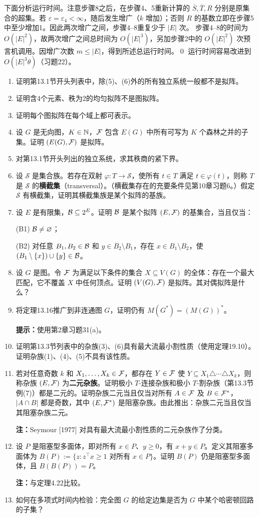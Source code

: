 下面分析运行时间。注意步骤8之后，在步骤4、5重新计算的 $\overline S,\overline T,R$ 分别是原集合的超集。若 $\varepsilon=\varepsilon_4<\infty$，随后发生增广（$k$ 增加）；否则 $R$ 的基数立即在步骤5中至少增加1。因此两次增广之间，步骤4--8重复少于 $|E|$ 次。
步骤4--8的时间为 $O(|E|^2)$，故两次增广之间总时间为 $O(|E|^3)$，另加步骤2中的 $O(|E|^2)$ 次预言机调用。因增广次数 $m\le|E|$，得到所述总运行时间。\qed
运行时间容易改进到 $O(|E|^3\theta)$（习题22）。
\begin{enumerate}[label=\arabic*.]
\item 证明第13.1节开头列表中，除(5)、(6)外的所有独立系统一般都不是拟阵。
\item 证明含4个元素、秩为2的均匀拟阵不是图拟阵。
\item 证明每个图拟阵在每个域上都可表示。
\item 设 $G$ 是无向图，$K\in\mathbb N$，$\mathcal F$ 包含 $E(G)$ 中所有可写为 $K$ 个森林之并的子集。证明 $(E(G),\mathcal F)$ 是拟阵。
\item 对第13.1节开头列出的独立系统，求其秩商的紧下界。
\item 设 $\mathcal S$ 是集合族。若存在双射 $\varphi:T\to\mathcal S$，使所有 $t\in T$ 满足 $t\in\varphi(t)$，则称 $T$ 是 $\mathcal S$ 的\textbf{横截集}（transversal）。（横截集存在的充要条件见第10章习题6。）假定 $\mathcal S$ 有横截集，证明其横截集族是某个拟阵的基族。
\item 设 $E$ 是有限集，$\mathcal B\subseteq2^E$。证明 $\mathcal B$ 是某个拟阵 $(E,\mathcal F)$ 的基集合，当且仅当：\par
(B1) $\mathcal B\ne\varnothing$；\par
(B2) 对任意 $B_1,B_2\in\mathcal B$ 和 $y\in B_2\setminus B_1$，存在 $x\in B_1\setminus B_2$，使 $(B_1\setminus\{x\})\cup\{y\}\in\mathcal B$。
\item 设 $G$ 是图。令 $\mathcal F$ 为满足以下条件的集合 $X\subseteq V(G)$ 的全体：存在一个最大匹配，它不覆盖 $X$ 中任何顶点。证明 $(V(G),\mathcal F)$ 是拟阵。其对偶拟阵是什么？
\item 将定理13.16推广到非连通图 $G$，证明仍有 $M(G^*)=(M(G))^*$。\par
\textbf{提示：}使用第2章习题31(a)。
\item 证明第13.3节列表中的杂族(3)、(6)具有最大流最小割性质（使用定理19.10）。证明杂族(1)、(4)、(5)不具有该性质。
\item[$11.^*$] 若对任意奇数 $k$ 和 $X_1,\ldots,X_k\in\mathcal F$，都存在 $Y\in\mathcal F$ 使 $Y\subseteq X_1\triangle\cdots\triangle X_k$，则称杂族 $(E,\mathcal F)$ 为\textbf{二元杂族}。证明极小 $T$-连接杂族和极小 $T$-割杂族（第13.3节例(7)）都是二元的。证明杂族二元当且仅当对所有 $A\in\mathcal F$ 及 $B\in\mathcal F^*$，$|A\cap B|$ 都是奇数，其中 $(E,\mathcal F^*)$ 是阻塞杂族。由此推出：杂族二元当且仅当其阻塞杂族二元。\par
\textbf{注：}Seymour [1977] 对具有最大流最小割性质的二元杂族作了分类。
\item[$12.^*$] 设 $P$ 是阻塞型多面体，即对所有 $x\in P$、$y\ge0$，有 $x+y\in P$。定义其阻塞多面体为 $B(P):=\{z:z^\top x\ge1\text{ 对所有 }x\in P\}$。证明 $B(P)$ 仍是阻塞型多面体，且 $B(B(P))=P$。\par
\textbf{注：}与定理4.22比较。
\setcounter{enumi}{12}
\item 如何在多项式时间内检验：完全图 $G$ 的给定边集是否为 $G$ 中某个哈密顿回路的子集？
\end{enumerate}

